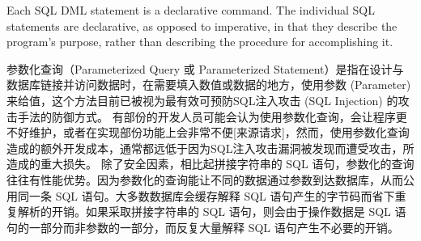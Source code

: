 Each SQL DML statement is a declarative command. The individual SQL statements are declarative, as opposed to imperative, in that they describe the program's purpose, rather than describing the procedure for accomplishing it.

参数化查询（Parameterized Query 或 Parameterized Statement）是指在设计与数据库链接并访问数据时，在需要填入数值或数据的地方，使用参数 (Parameter) 来给值，这个方法目前已被视为最有效可预防SQL注入攻击 (SQL Injection) 的攻击手法的防御方式。
有部份的开发人员可能会认为使用参数化查询，会让程序更不好维护，或者在实现部份功能上会非常不便[来源请求]，然而，使用参数化查询造成的额外开发成本，通常都远低于因为SQL注入攻击漏洞被发现而遭受攻击，所造成的重大损失。
除了安全因素，相比起拼接字符串的 SQL 语句，参数化的查询往往有性能优势。因为参数化的查询能让不同的数据通过参数到达数据库，从而公用同一条 SQL 语句。大多数数据库会缓存解释 SQL 语句产生的字节码而省下重复解析的开销。如果采取拼接字符串的 SQL 语句，则会由于操作数据是 SQL 语句的一部分而非参数的一部分，而反复大量解释 SQL 语句产生不必要的开销。

